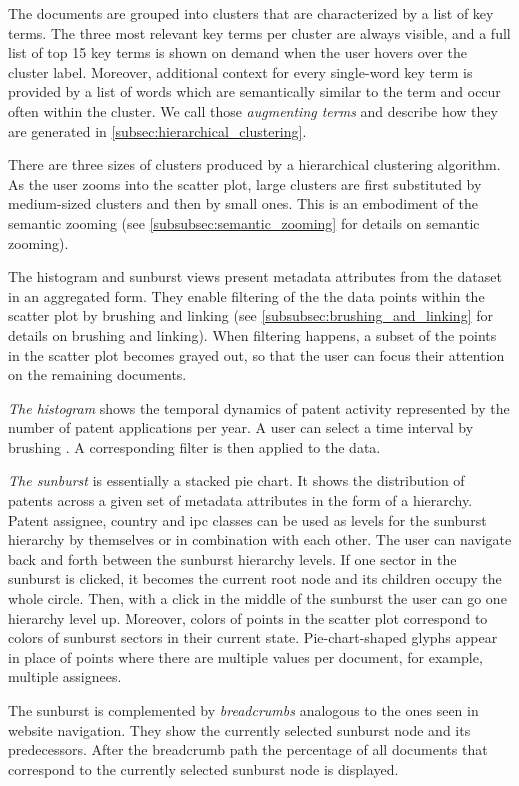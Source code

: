 The documents are grouped into clusters that are characterized by a list of key terms.
The three most relevant key terms per cluster are always visible, and a full list of top 15 key terms is shown on demand when the user hovers over the cluster label.
Moreover, additional context for every single-word key term is provided by a list of words which are semantically similar to the term and occur often within the cluster.
We call those \textit{augmenting terms} and describe how they are generated in \autoref{subsec:hierarchical_clustering}.

There are three sizes of clusters produced by a hierarchical clustering algorithm.
As the user zooms into the scatter plot, large clusters are first substituted by medium-sized clusters and then by small ones.
This is an embodiment of the semantic zooming (see \autoref{subsubsec:semantic_zooming} for details on semantic zooming).

The histogram and sunburst views present metadata attributes from the dataset in an aggregated form. 
They enable filtering of the the data points within the scatter plot by brushing and linking (see \autoref{subsubsec:brushing_and_linking} for details on brushing and linking).
When filtering happens, a subset of the points in the scatter plot becomes grayed out, so that the user can focus their attention on the remaining documents.

\textit{The histogram} shows the temporal dynamics of patent activity represented by the number of patent applications per year.
A user can select a time interval by brushing .
A corresponding filter is then applied to the data.

\textit{The sunburst} is essentially a stacked pie chart.
It shows the distribution of patents across a given set of metadata attributes in the form of a hierarchy.
Patent assignee, country and \gls{ipc} classes can be used as levels for the sunburst hierarchy by themselves or in combination with each other.
The user can navigate back and forth between the sunburst hierarchy levels.
If one sector in the sunburst is clicked, it becomes the current root node and its children occupy the whole circle.
Then, with a click in the middle of the sunburst the user can go one hierarchy level up.
Moreover, colors of points in the scatter plot correspond to colors of sunburst sectors in their current state.
Pie-chart-shaped glyphs appear in place of points where there are multiple values per document, for example, multiple assignees.

The sunburst is complemented by \textit{breadcrumbs} analogous to the ones seen in website navigation.
They show the currently selected sunburst node and its predecessors.
After the breadcrumb path the percentage of all documents that correspond to the currently selected sunburst node is displayed.

